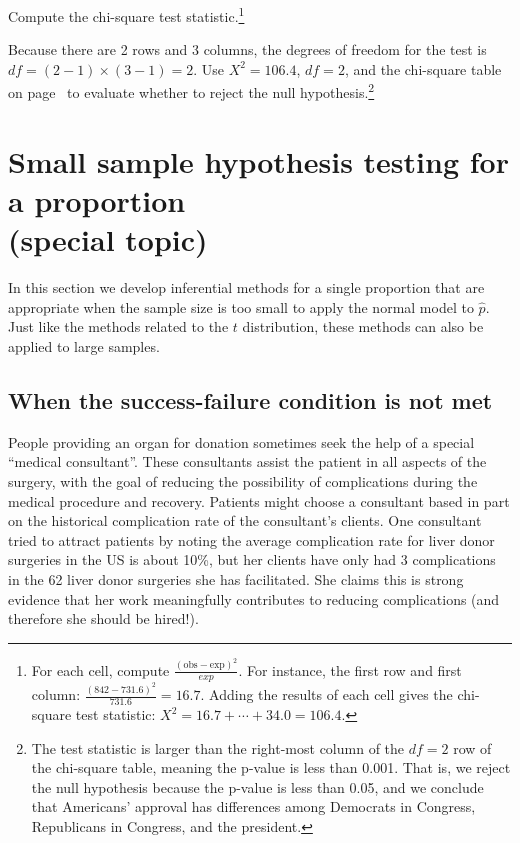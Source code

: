 \begin{exercise}
Compute the chi-square test statistic.\footnote{For each cell, compute $\frac{(\text{obs} - \text{exp})^2}{exp}$. For instance, the first row and first column: $\frac{(842-731.6)^2}{731.6} = 16.7$. Adding the results of each cell gives the chi-square test statistic: {\scriptsize$X^2 = 16.7 + \cdots + 34.0 = 106.4$}.}
\end{exercise}

\begin{exercise}
Because there are 2 rows and 3 columns, the degrees of freedom for the test is $df=(2-1)\times (3-1) = 2$. Use $X^2=106.4$, $df=2$, and the chi-square table on page~\pageref{chiSquareProbabilityTable} to evaluate whether to reject the null hypothesis.\footnote{The test statistic is larger than the right-most column of the $df=2$ row of the chi-square table, meaning the p-value is less than 0.001. That is, we reject the null hypothesis because the p-value is less than 0.05, and we conclude that Americans' approval has differences among Democrats in Congress, Republicans in Congress, and the president.}
\end{exercise}




\section[Small sample hypothesis testing for a proportion (special topic)]{Small sample hypothesis testing for a proportion\\(special topic)}
\label{smallSampleHTForProportion}

In this section we develop inferential methods for a single proportion that are appropriate when the sample size is too small to apply the normal model to $\hat{p}$. Just like the methods related to the $t$ distribution, these methods can also be applied to large samples.

\subsection{When the success-failure condition is not met}

People providing an organ for donation sometimes seek the help of a special ``medical consultant''. These consultants assist the patient in all aspects of the surgery, with the goal of reducing the possibility of complications during the medical procedure and recovery. Patients might choose a consultant based in part on the historical complication rate of the consultant's clients. One consultant tried to attract patients by noting the average complication rate for liver donor surgeries in the US is about 10\%, but her clients have only had 3 complications in the 62 liver donor surgeries she has facilitated. She claims this is strong evidence that her work meaningfully contributes to reducing complications (and therefore she should be hired!).

